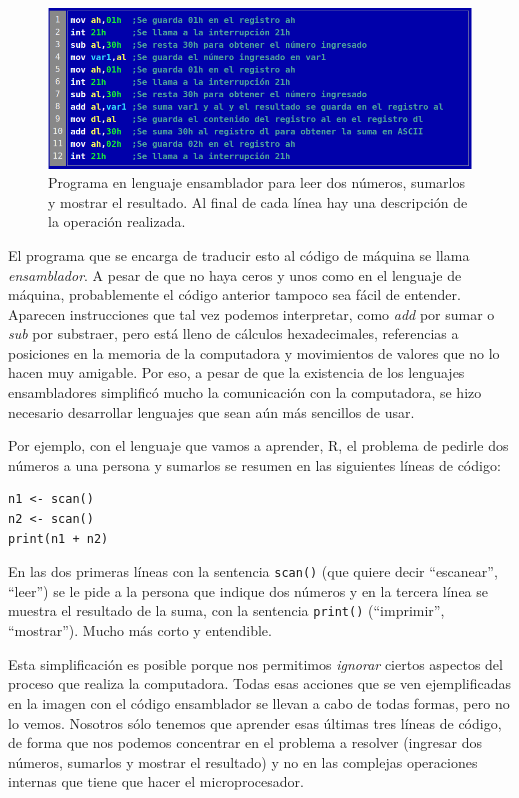 \documentclass[
]{book}
\begin{document}
\begin{figure}

{\centering \includegraphics[width=1\linewidth]{images/intro/ensamblador} 

}

\caption{Programa en lenguaje ensamblador para leer dos números, sumarlos y mostrar el resultado. Al final de cada línea hay una descripción de la operación realizada.}\label{fig:unnamed-chunk-5}
\end{figure}

El programa que se encarga de traducir esto al código de máquina se llama \emph{ensamblador}. A pesar de que no haya ceros y unos como en el lenguaje de máquina, probablemente el código anterior tampoco sea fácil de entender. Aparecen instrucciones que tal vez podemos interpretar, como \emph{add} por sumar o \emph{sub} por substraer, pero está lleno de cálculos hexadecimales, referencias a posiciones en la memoria de la computadora y movimientos de valores que no lo hacen muy amigable. Por eso, a pesar de que la existencia de los lenguajes ensambladores simplificó mucho la comunicación con la computadora, se hizo necesario desarrollar lenguajes que sean aún más sencillos de usar.

Por ejemplo, con el lenguaje que vamos a aprender, R, el problema de pedirle dos números a una persona y sumarlos se resumen en las siguientes líneas de código:

\begin{verbatim}
n1 <- scan()
n2 <- scan()
print(n1 + n2)
\end{verbatim}

En las dos primeras líneas con la sentencia \texttt{scan()} (que quiere decir ``escanear'', ``leer'') se le pide a la persona que indique dos números y en la tercera línea se muestra el resultado de la suma, con la sentencia \texttt{print()} (``imprimir'', ``mostrar''). Mucho más corto y entendible.

Esta simplificación es posible porque nos permitimos \emph{ignorar} ciertos aspectos del proceso que realiza la computadora. Todas esas acciones que se ven ejemplificadas en la imagen con el código ensamblador se llevan a cabo de todas formas, pero no lo vemos. Nosotros sólo tenemos que aprender esas últimas tres líneas de código, de forma que nos podemos concentrar en el problema a resolver (ingresar dos números, sumarlos y mostrar el resultado) y no en las complejas operaciones internas que tiene que hacer el microprocesador.
\end{document}
